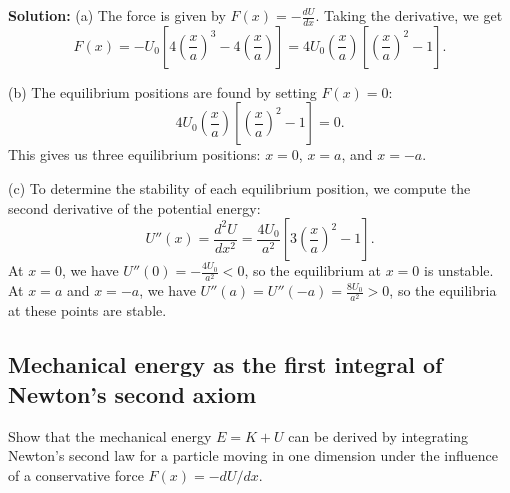 \documentclass[../main.tex]{subfiles}
\begin{document}
\textbf{Solution:}
(a) The force is given by $F(x) = -\frac{dU}{dx}$. Taking the derivative, we get
\begin{equation}
    F(x) = -U_0 \left[4\left(\frac{x}{a}\right)^3 - 4\left(\frac{x}{a}\right)\right] = 4U_0\left(\frac{x}{a}\right)\left[\left(\frac{x}{a}\right)^2 - 1\right].
\end{equation}

(b) The equilibrium positions are found by setting $F(x) = 0$:
\begin{equation}
    4U_0\left(\frac{x}{a}\right)\left[\left(\frac{x}{a}\right)^2 - 1\right] = 0.
\end{equation}
This gives us three equilibrium positions: $x = 0$, $x = a$, and $x = -a$.

(c) To determine the stability of each equilibrium position, we compute the second derivative of the potential energy:
\begin{equation}
    U''(x) = \frac{d^2U}{dx^2} = \frac{4U_0}{a^2}\left[3\left(\frac{x}{a}\right)^2 - 1\right].
\end{equation}
At $x = 0$, we have $U''(0) = -\frac{4U_0}{a^2} < 0$, so the equilibrium at $x = 0$ is unstable.
At $x = a$ and $x = -a$, we have $U''(a) = U''(-a) = \frac{8U_0}{a^2} > 0$, so the equilibria at these points are stable.


\subsection{Mechanical energy as the first integral of Newton's second axiom}
Show that the mechanical energy $E = K + U$  can be derived by integrating Newton's second law for a particle moving in one dimension under the influence of a conservative force $F(x)=-dU/dx$.
\end{document}
